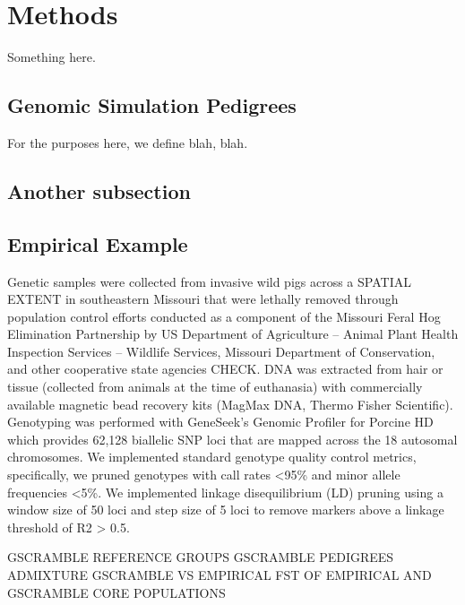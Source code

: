 \section*{Methods}

Something here.

\subsection*{Genomic Simulation Pedigrees}

For the purposes here, we define blah, blah.

\subsection*{Another subsection}



\subsection*{Empirical Example}

Genetic samples were collected from invasive wild pigs across a SPATIAL EXTENT in southeastern Missouri that were lethally removed through population control efforts conducted as a component of the Missouri Feral Hog Elimination Partnership 
by US Department of Agriculture – Animal Plant Health Inspection Services – Wildlife Services, Missouri Department of Conservation, and other cooperative state agencies CHECK. 
DNA was extracted from hair or tissue (collected from animals at the time of euthanasia) with commercially available magnetic bead recovery kits (MagMax DNA, Thermo Fisher Scientific).  
Genotyping was performed with GeneSeek’s Genomic Profiler for Porcine HD which provides 62,128 biallelic SNP loci that are mapped across the 18 autosomal chromosomes. 
We implemented standard genotype quality control metrics, specifically, we pruned genotypes with call rates <95\% and minor allele frequencies <5\%.
We implemented linkage disequilibrium (LD) pruning using a window size of 50 loci and step size of 5 loci to remove markers above a linkage threshold of R2 > 0.5.

GSCRAMBLE REFERENCE GROUPS
GSCRAMBLE PEDIGREES
ADMIXTURE GSCRAMBLE VS EMPIRICAL
FST OF EMPIRICAL AND GSCRAMBLE CORE POPULATIONS




